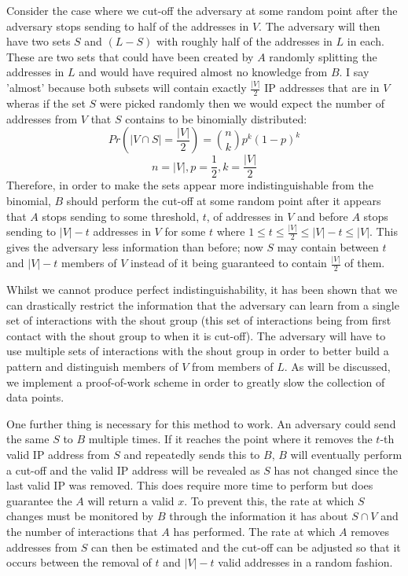 \documentclass[ %
                    author={Luke Murray},
                supervisor={Dr. Simon Hollis},
                     title={Shadow Peer-to-Peer Networks},
                  subtitle={},
                    degree={MEng},
                      year={2013} ]{thesis}
\begin{document}
Consider the case where we cut-off the adversary at some random point after the adversary stops sending to half of the addresses in $V$. The adversary will then have two sets $S$ and $(L - S)$ with roughly half of the addresses in $L$ in each. These are two sets that could have been created by $A$ randomly splitting the addresses in $L$ and would have required almost no knowledge from $B$. I say 'almost' because both subsets will contain exactly $\frac{|V|}{2}$ IP addresses that are in $V$ wheras if the set $S$ were picked randomly then we would expect the number of addresses from $V$ that $S$ contains to be binomially distributed: \[Pr(|V \cap S| = \frac{|V|}{2}) = {n \choose k}p^{k}(1-p)^{k}\]\[n = |V|, p = \frac{1}{2}, k = \frac{|V|}{2}\] Therefore, in order to make the sets appear more indistinguishable from the binomial, $B$ should perform the cut-off at some random point after it appears that $A$ stops sending to some threshold, $t$, of addresses in $V$ and before $A$ stops sending to $|V| - t$ addresses in $V$ for some $t$ where $1 \leq t \leq \frac{|V|}{2} \leq |V| - t \leq |V|$. This gives the adversary less information than before; now $S$ may contain between $t$ and $|V| - t$ members of $V$ instead of it being guaranteed to contain $\frac{|V|}{2}$ of them.

Whilst we cannot produce perfect indistinguishability, it has been shown that we can drastically restrict the information that the adversary can learn from a single set of interactions with the shout group (this set of interactions being from first contact with the shout group to when it is cut-off). The adversary will have to use multiple sets of interactions with the shout group in order to better build a pattern and distinguish members of $V$ from members of $L$. As will be discussed, we implement a proof-of-work scheme in order to greatly slow the collection of data points.

One further thing is necessary for this method to work. An adversary could send the same $S$ to $B$ multiple times. If it reaches the point where it removes the $t$-th valid IP address from $S$ and repeatedly sends this to $B$, $B$ will eventually perform a cut-off and the valid IP address will be revealed as $S$ has not changed since the last valid IP was removed. This does require more time to perform but does guarantee the $A$ will return a valid $x$. To prevent this, the rate at which $S$ changes must be monitored by $B$ through the information it has about $S \cap V$ and the number of interactions that $A$ has performed. The rate at which $A$ removes addresses from $S$ can then be estimated and the cut-off can be adjusted so that it occurs between the removal of $t$ and $|V| - t$ valid addresses in a random fashion.
\end{document}
